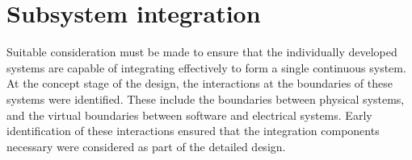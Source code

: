 \documentclass[main.tex]{subfiles}
\begin{document}
\section{Subsystem integration}
Suitable consideration must be made to ensure that the individually developed systems are capable of integrating effectively to form a single continuous system. At the concept stage of the design, the interactions at the boundaries of these systems were identified. These include the boundaries between physical systems, and the virtual boundaries between software and electrical systems. Early identification of these interactions ensured that the integration components necessary were considered as part of the detailed design.



\end{document}
